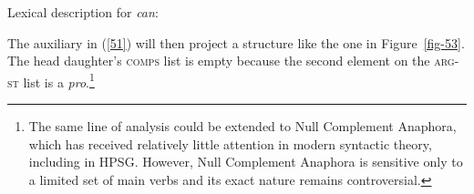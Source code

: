 \eas
\label{51}
Lexical description for \textit{can}:\\
\zs
%
%
\iffalse{
Given this, \ili{English} Post-Auxiliary Ellipsis can be analyzed as a language-particular VP \textit{pro} drop phenomenon, triggered
by a constraint like (\ref{52}) (see \citet{Kim:00, KimSag2005, KimSellsIntroduction, ginzburg-miller-ellipsis-handbook}). 

\inlinetodostefan{
AVM: type name too long and second column not used, brackets around \type{pro} should be normal text
brackets}


\ea\label{52}
Aux-Ellipsis Construction:\\
\avm{
[\type*{aux-v-lxm}
 arg-st < \1\,XP,  YP > & ] } $\mapsto$
\avm{
[\type*{aux-pae-wd}
 comps < > \\
 arg-st < \1\,XP, YP![\type{pro}]! > & ]
}
\z
What this tells us is that an auxiliary verb selecting two arguments
can be projected onto an elided auxiliary verb whose second argument
is realized as a small \textit{pro}. This argument is not mapped
onto any grammatical function on the \textsc{comps} list.}\fi
The auxiliary
in (\ref{51}) will then project a structure like the one
in Figure~\ref{fig-53}.
%
%
The head daughter's \textsc{comps} list is empty because the second element on the \textsc{arg-st} list
is a \textit{pro}.\footnote{The same line of analysis could be extended to 
Null Complement Anaphora, which has received relatively little attention in modern syntactic theory, including in HPSG. However, Null Complement Anaphora is sensitive only to a limited set of main verbs and its exact nature remains controversial.}
